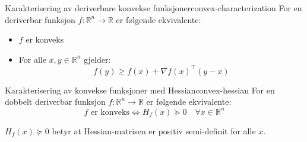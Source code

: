 \begin{theorem}{Karakterisering av deriverbare konvekse funksjoner}{convex-characterization}
  For en deriverbar funksjon $f: \mathbb{R}^n \to \mathbb{R}$ er følgende ekvivalente:
  \begin{itemize}
    \item $f$ er konveks
    \item For alle $x, y \in \mathbb{R}^n$ gjelder:
          \[
            f(y) \geq f(x) + \nabla f(x)^\top (y - x)
          \]
  \end{itemize}
\end{theorem}

\begin{theorem}{Karakterisering av konvekse funksjoner med Hessian}{convex-hessian}
  For en dobbelt deriverbar funksjon $f: \mathbb{R}^n \to \mathbb{R}$ er følgende ekvivalente:
  \[
    f \text{ er konveks} \iff H_f(x) \succeq 0 \quad \forall x \in \mathbb{R}^n
  \]

  $H_f(x) \succeq 0$ betyr at Hessian-matrisen er positiv semi-definit for alle $x$.

\end{theorem}

